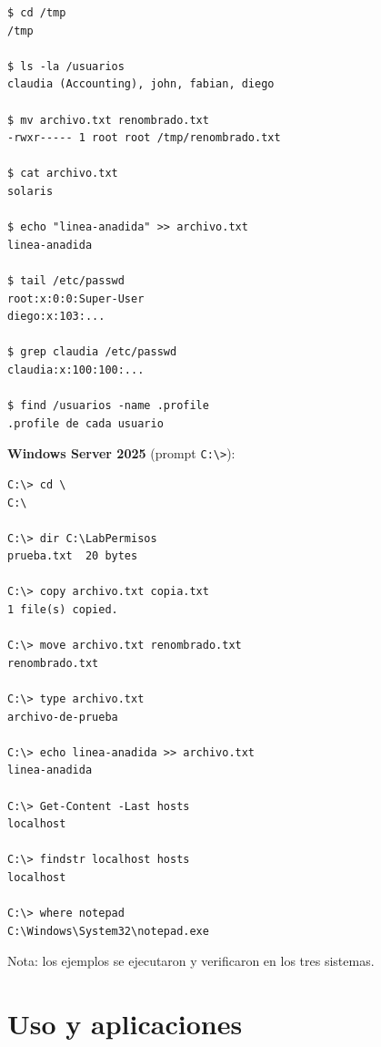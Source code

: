 \documentclass[11pt,a4paper]{report}
\begin{document}
\begin{verbatim}
$ cd /tmp
/tmp

$ ls -la /usuarios
claudia (Accounting), john, fabian, diego

$ mv archivo.txt renombrado.txt
-rwxr----- 1 root root /tmp/renombrado.txt

$ cat archivo.txt
solaris

$ echo "linea-anadida" >> archivo.txt
linea-anadida

$ tail /etc/passwd
root:x:0:0:Super-User
diego:x:103:...

$ grep claudia /etc/passwd
claudia:x:100:100:...

$ find /usuarios -name .profile
.profile de cada usuario
\end{verbatim}

\textbf{Windows Server 2025} (prompt \texttt{C:\textbackslash{}>}):

\begin{verbatim}
C:\> cd \
C:\

C:\> dir C:\LabPermisos
prueba.txt  20 bytes

C:\> copy archivo.txt copia.txt
1 file(s) copied.

C:\> move archivo.txt renombrado.txt
renombrado.txt

C:\> type archivo.txt
archivo-de-prueba

C:\> echo linea-anadida >> archivo.txt
linea-anadida

C:\> Get-Content -Last hosts
localhost

C:\> findstr localhost hosts
localhost

C:\> where notepad
C:\Windows\System32\notepad.exe
\end{verbatim}

Nota: los ejemplos se ejecutaron y verificaron en los tres sistemas.

\clearpage
\section{Uso y aplicaciones}
\end{document}
